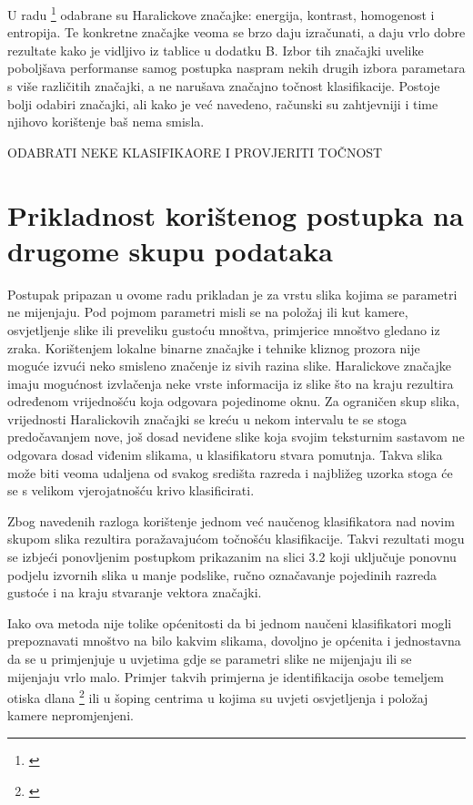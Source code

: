 \documentclass[times, utf8, zavrsni]{fer}
\begin{document}
\bigbreak

U radu \footnote{\cite{6266412}} odabrane su Haralickove značajke: energija, kontrast,
homogenost i entropija. Te konkretne značajke veoma se brzo daju izračunati, a daju 
vrlo dobre rezultate kako je vidljivo iz tablice u dodatku B. Izbor tih značajki uvelike poboljšava
performanse samog postupka naspram nekih drugih izbora parametara s više različitih značajki, a
ne narušava značajno točnost klasifikacije. Postoje bolji odabiri značajki, ali kako je već navedeno, 
računski su zahtjevniji i time njihovo korištenje baš nema smisla. 

\bigbreak

ODABRATI NEKE KLASIFIKAORE I PROVJERITI TOČNOST


\chapter{Prikladnost korištenog postupka na drugome skupu podataka}

Postupak pripazan u ovome radu prikladan je za vrstu slika kojima se parametri ne mijenjaju. Pod 
pojmom parametri misli se na položaj ili kut kamere, osvjetljenje slike ili preveliku gustoću mnoštva, 
primjerice mnoštvo gledano iz zraka. Korištenjem lokalne binarne značajke i tehnike kliznog prozora
nije moguće izvući neko smisleno značenje iz sivih razina slike. Haralickove značajke imaju
mogućnost izvlačenja neke vrste informacija iz slike što na kraju rezultira određenom vrijednošću
koja odgovara pojedinome oknu. Za ograničen skup slika, vrijednosti Haralickovih značajki 
se kreću u nekom intervalu te se stoga predočavanjem nove, još dosad neviđene slike koja
svojim teksturnim sastavom ne odgovara dosad viđenim slikama, u klasifikatoru stvara pomutnja.
Takva slika može biti veoma udaljena od svakog središta razreda i najbližeg uzorka stoga 
će se s velikom vjerojatnošću krivo klasificirati. 

\bigbreak

Zbog navedenih razloga korištenje jednom već naučenog klasifikatora nad novim skupom
slika rezultira poražavajućom točnošću klasifikacije. Takvi rezultati mogu se izbjeći
ponovljenim postupkom prikazanim na slici 3.2 koji uključuje ponovnu podjelu
izvornih slika u manje podslike, ručno označavanje pojedinih razreda gustoće i 
na kraju stvaranje vektora značajki. 

\bigbreak

Iako ova metoda nije tolike općenitosti da bi jednom naučeni klasifikatori mogli
prepoznavati mnoštvo na bilo kakvim slikama, dovoljno je općenita i jednostavna
da se u primjenjuje u uvjetima gdje se parametri slike ne mijenjaju ili se mijenjaju vrlo
malo. Primjer takvih primjerna je identifikacija osobe temeljem otiska dlana \footnote{\cite{1512051}}
ili u šoping centrima u kojima su uvjeti osvjetljenja i položaj kamere nepromjenjeni.
\end{document}
